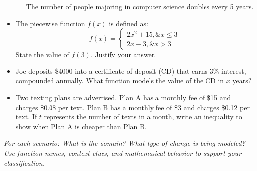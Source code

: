\documentclass[12pt]{article}
\begin{document}
\begin{itemize}
  \ \ \ The number of people majoring in computer science doubles every 5 years.
  \item The piecewise function $f(x)$ is defined as:
  \[ f(x) = \begin{cases} 2x^2 + 15, \& x \leq 3 \\ 2x - 3, \& x > 3 \end{cases} \]
  State the value of $f(3)$. Justify your answer.
  \item Joe deposits \$4000 into a certificate of deposit (CD) that earns 3\% interest, compounded annually. What function models the value of the CD in $x$ years?
  \item Two texting plans are advertised. Plan A has a monthly fee of \$15 and charges \$0.08 per text. Plan B has a monthly fee of \$3 and charges \$0.12 per text. If $t$ represents the number of texts in a month, write an inequality to show when Plan A is cheaper than Plan B.
\end{itemize}

\vspace{1em}
\textit{For each scenario: What is the domain? What type of change is being modeled? Use function names, context clues, and mathematical behavior to support your classification.}
\end{document}
